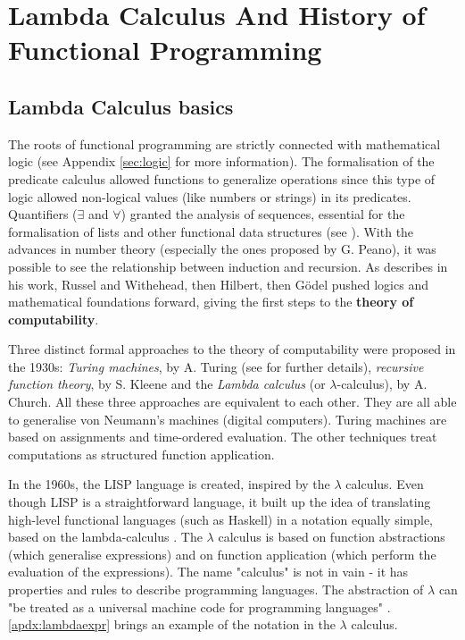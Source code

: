 \chapter{Lambda Calculus And History of Functional Programming}
\label{sec:lc}

\section{Lambda Calculus basics}
\label{sec:apdxbasicsls}

The roots of functional programming are strictly connected with mathematical logic (see Appendix \ref{sec:logic} for more information). The formalisation of the predicate calculus allowed functions to generalize operations since this type of logic allowed non-logical values (like numbers or strings) in its predicates. Quantifiers ($ \exists $ and $ \forall $) granted the analysis of sequences, essential for the formalisation of lists and other functional data structures (see \cite{okasaki1999purely}). With the advances in number theory (especially the ones proposed by G. Peano), it was possible to see the relationship between induction and recursion. As \cite{michaelson2011introduction} describes in his work, Russel and Withehead, then Hilbert, then G\"{o}del pushed logics and mathematical foundations forward, giving the first steps to the \textbf{theory of computability}.

Three distinct formal approaches to the theory of computability were proposed in the 1930s: \textit{Turing machines}, by A. Turing (see \cite{boolos2002computability} for further details), \textit{recursive function theory}, by S. Kleene and the \textit{Lambda calculus} (or $ \lambda$-calculus), by A. Church. All these three approaches are equivalent to each other. They are all able to generalise von Neumann's machines (digital computers). Turing machines are based on assignments and time-ordered evaluation. The other techniques treat computations as structured function application. 

In the 1960s, the LISP language is created, inspired by the $\lambda$ calculus. Even though LISP is a straightforward language, it built up the idea of translating high-level functional languages (such as Haskell) in a notation equally simple, based on the lambda-calculus \cite{peyton1987implementation}. The $\lambda$ calculus is based on function abstractions (which generalise expressions) and on function application (which perform the evaluation of the expressions). The name "calculus" is not in vain - it has properties and rules to describe programming languages. The abstraction of $\lambda$ can "be treated as a universal machine code for programming languages" \cite{michaelson2011introduction}. \ref{apdx:lambdaexpr} brings an example of the notation in the $\lambda$ calculus.

